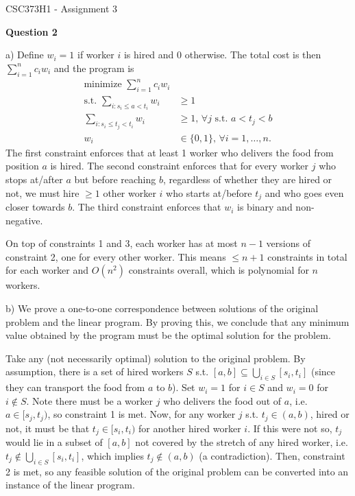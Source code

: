 \documentclass[11pt]{article}
\begin{document}
\begin{center}
{\Large CSC373H1 - Assignment 3}
\end{center}

\textbf{Question 2}

a) Define $w_i=1$ if worker $i$ is hired and $0$ otherwise. The total cost is then $\sum_{i=1}^n c_i w_i$ and the program is \begin{align*}
    \text{minimize }\sum_{i=1}^n c_i w_i\\
    \text{s.t. }\sum_{i:s_i\leq a<t_i} w_i &\geq 1\\
    \sum_{i:s_i\leq t_j<t_i} w_i &\geq 1 \text{, }\forall j \text{ s.t. } a<t_j<b\\
    w_i &\in\{0,1\}\text{, }\forall i=1,\ldots,n.
\end{align*}The first constraint enforces that at least 1 worker who delivers the food from position $a$ is hired. The second constraint enforces that for every worker $j$ who stops at/after $a$ but before reaching $b$, regardless of whether they are hired or not, we must hire $\geq 1$ other worker $i$ who starts at/before $t_j$ and who goes even closer towards $b$. The third constraint enforces that $w_i$ is binary and non-negative.

On top of constraints 1 and 3, each worker has at most $n-1$ versions of constraint 2, one for every other worker. This means $\leq n+1$ constraints in total for each worker and $O(n^2)$ constraints overall, which is polynomial for $n$ workers.

b) We prove a one-to-one correspondence between solutions of the original problem and the linear program. By proving this, we conclude that any minimum value obtained by the program must be the optimal solution for the problem.

Take any (not necessarily optimal) solution to the original problem. By assumption, there is a set of hired workers $S$ s.t. $[a,b]\subseteq \bigcup_{i\in S} [s_i,t_i]$ (since they can transport the food from $a$ to $b$). Set $w_i=1$ for $i\in S$ and $w_i=0$ for $i\notin S$. Note there must be a worker $j$ who delivers the food out of $a$, i.e. $a\in [s_j,t_j)$, so constraint 1 is met. Now, for any worker $j$ s.t. $t_j\in (a,b)$, hired or not, it must be that $t_j\in [s_i,t_i)$ for another hired worker $i$. If this were not so, $t_j$ would lie in a subset of $[a,b]$ not covered by the stretch of any hired worker, i.e. $t_j\notin \bigcup_{i\in S} [s_i,t_i]$, which implies $t_j\notin (a,b)$ (a contradiction). Then, constraint 2 is met, so any feasible solution of the original problem can be converted into an instance of the linear program.
\end{document}
